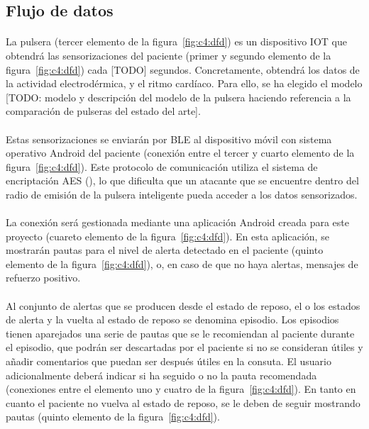 \subsection{Flujo de datos}
\paragraph{}
La pulsera (tercer elemento de la figura~\ref{fig:c4:dfd}) es un dispositivo IOT que obtendrá las sensorizaciones del paciente (primer y segundo elemento de la figura~\ref{fig:c4:dfd}) cada [TODO] segundos. Concretamente, obtendrá los datos de la actividad electrodérmica, y el ritmo cardíaco. Para ello, se ha elegido el modelo [TODO: modelo y descripción del modelo de la pulsera haciendo referencia a la comparación de pulseras del estado del arte].

\paragraph{}
Estas sensorizaciones se enviarán por \ac{BLE} al dispositivo móvil con sistema operativo Android del paciente (conexión entre el tercer y cuarto elemento de la figura~\ref{fig:c4:dfd}). Este protocolo de comunicación utiliza el sistema de encriptación \ac{AES} (\citep{ble-aes}), lo que dificulta que un atacante que se encuentre dentro del radio de emisión de la pulsera inteligente pueda acceder a los datos sensorizados.

\paragraph{}
La conexión será gestionada mediante una aplicación Android creada para este proyecto (cuareto elemento de la figura~\ref{fig:c4:dfd}). En esta aplicación, se mostrarán pautas para el nivel de alerta detectado en el paciente (quinto elemento de la figura~\ref{fig:c4:dfd}), o, en caso de que no haya alertas, mensajes de refuerzo positivo.

\paragraph{}
Al conjunto de alertas que se producen desde el estado de reposo, el o los estados de alerta y la vuelta al estado de reposo se denomina episodio. Los episodios tienen aparejados una serie de pautas que se le recomiendan al paciente durante el episodio, que podrán ser descartadas por el paciente si no se consideran útiles y añadir comentarios que puedan ser después útiles en la consuta. El usuario adicionalmente deberá indicar si ha seguido o no la pauta recomendada (conexiones entre el elemento uno y cuatro de la figura~\ref{fig:c4:dfd}). En tanto en cuanto el paciente no vuelva al estado de reposo, se le deben de seguir mostrando pautas (quinto elemento de la figura~\ref{fig:c4:dfd}).

